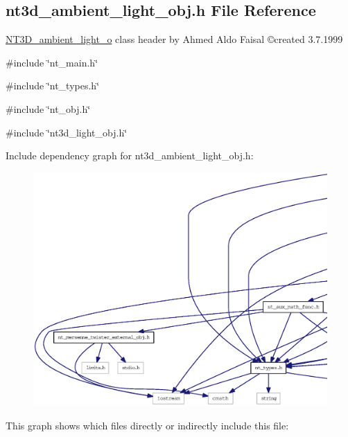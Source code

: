 \subsection{nt3d\_\-ambient\_\-light\_\-obj.h File Reference}
\label{nt3d__ambient__light__obj_8h}



\begin{DoxyItemize}
\item \hyperlink{class_n_t3_d__ambient__light__o}{NT3D\_\-ambient\_\-light\_\-o} class header by Ahmed Aldo Faisal \copyright created 3.7.1999 
\end{DoxyItemize} 


{\ttfamily \#include \char`\"{}nt\_\-main.h\char`\"{}}\par
{\ttfamily \#include \char`\"{}nt\_\-types.h\char`\"{}}\par
{\ttfamily \#include \char`\"{}nt\_\-obj.h\char`\"{}}\par
{\ttfamily \#include \char`\"{}nt3d\_\-light\_\-obj.h\char`\"{}}\par
Include dependency graph for nt3d\_\-ambient\_\-light\_\-obj.h:
\nopagebreak
\begin{figure}[H]
\begin{center}
\leavevmode
\includegraphics[width=400pt]{nt3d__ambient__light__obj_8h__incl}
\end{center}
\end{figure}
This graph shows which files directly or indirectly include this file:
\nopagebreak
